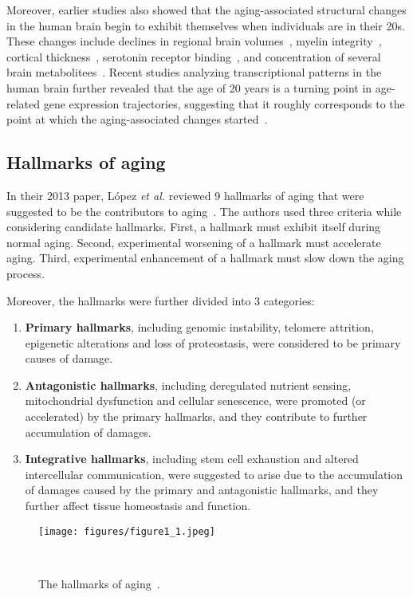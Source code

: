 Moreover, earlier studies also showed that the aging-associated structural changes in the human brain begin to exhibit themselves when individuals are in their 20s.
These changes include declines in regional brain volumes~\cite{Sowell2003}, myelin integrity~\cite{Sullivan2006}, cortical thickness~\cite{Salat2004, Magnotta1999},
serotonin receptor binding~\cite{Sheline2002}, and concentration of several brain metabolitees~\cite{Salthouse2009, Kadota2001}.
Recent studies analyzing transcriptional patterns in the human brain further revealed that the age of 20 years is a turning point in age-related gene expression trajectories,
suggesting that it roughly corresponds to the point at which the aging-associated changes started~\cite{Somel2010, Colantuoni2011, Donertas2017}.

\subsection{Hallmarks of aging}
In their 2013 paper, López \textit{et al.} reviewed 9 hallmarks of aging that were suggested to be the contributors to aging~\cite{Lopez2013}.
The authors used three criteria while considering candidate hallmarks. 
First, a hallmark must exhibit itself during normal aging.
Second, experimental worsening of a hallmark must accelerate aging.
Third, experimental enhancement of a hallmark must slow down the aging process. 

Moreover, the hallmarks were further divided into 3 categories:
\begin{enumerate}
    \item \textbf{Primary hallmarks}, including genomic instability, telomere attrition, epigenetic alterations and loss of proteostasis,
    were considered to be primary causes of damage.
    \item \textbf{Antagonistic hallmarks}, including deregulated nutrient sensing, mitochondrial dysfunction and cellular senescence,
    were promoted (or accelerated) by the primary hallmarks, and they contribute to further accumulation of damages.
    \item \textbf{Integrative hallmarks}, including stem cell exhaustion and altered intercellular communication, 
    were suggested to arise due to the accumulation of damages caused by the primary and antagonistic hallmarks,
    and they further affect tissue homeostasis and function.
\end{enumerate}

\begin{figure}[h]
    \centering
    \texttt{[image: figures/figure1\_1.jpeg]}
    \caption{The hallmarks of aging~\cite{Lopez2013}.
    }~\label{fig:fig1.1}
\end{figure}

